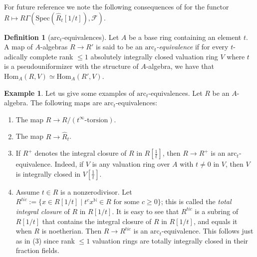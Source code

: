 \documentclass[reqno]{amsart}
\newcommand{\sF}{\mathcal{F}}
\newcommand{\spec}{\mathrm{Spec}}
\newcommand{\arc}{\mathrm{arc}}
\renewcommand{\hom}{\mathrm{Hom}}
\theoremstyle{definition}
\newtheorem{definition}[theorem]{Definition}
\newtheorem{example}[theorem]{Example}
\begin{document}
For future reference we note the following consequences 
of 
for the functor $R
\mapsto R \Gamma( \spec(\hat{R}_t[1/t]), \sF)$.


\begin{definition}[$\arc_t$-equivalences] 
Let $A$ be a base ring containing an element $t$. 
A map of $A$-algebras $R \to R'$ is said to be an
\emph{$\arc_t$-equivalence} if for every $t$-adically complete rank $\leq 1$
absolutely integrally closed valuation ring $V$ where $t$ is a pseudouniformizer
with the structure of $A$-algebra, we have that
$\hom_A(R, V) \simeq \hom_A(R', V)$. 
\end{definition} 


\begin{example} 
\label{examplesofarctequiv}
Let us give some examples of $\arc_t$-equivalences. Let $R$ be an $A$-algebra. The following maps are $\arc_t$-equivalences:
\begin{enumerate}
\item The map $R \to R/( t^\infty\text{-torsion})$. 
\item The map $R \to \hat{R}_t$. 
\item If $R^+$ denotes the integral closure of $R$ in $R[\frac{1}{t}]$, then $R \to R^+$ is an $\arc_t$-equivalence. Indeed, if $V$ is any valuation ring over $A$ with $t \neq 0$ in $V$, then $V$ is integrally closed in $V[\frac{1}{t}]$. 
\item 
Assume $t \in R$ is a nonzerodivisor. 
Let $R^{tic} := \{x \in R[1/t] \mid t^c x^{\mathbb{N}} \in R \text{ for some } c \geq 0\}$; this is called the \emph{total integral closure} of $R$ in $R[1/t]$. It is easy to see that $R^{tic}$ is a subring of $R[1/t]$ that contains the integral closure of $R$ in $R[1/t]$, and equals it when $R$ is noetherian. Then $R \to R^{tic}$ is an $\arc_t$-equivalence. This follows just as in (3) since rank $\leq 1$ valuation rings are totally integrally closed in their fraction fields. 
\end{enumerate}
\end{example} 
\end{document}
